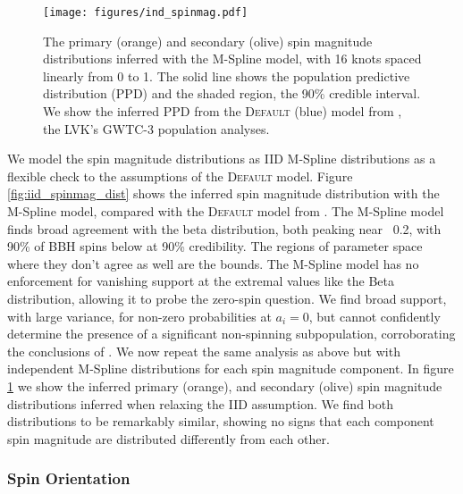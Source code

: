 \begin{figure} 
    \begin{centering}
        \texttt{[image: figures/ind\_spinmag.pdf]}
        \caption{The primary (orange) and secondary (olive) spin magnitude distributions inferred with the M-Spline model, 
        with 16 knots spaced linearly from 0 to 1. The solid line shows the population predictive distribution (PPD) and the shaded region, the 90\% credible interval. 
        We show the inferred PPD from the \textsc{Default} (blue) model from \citet{o3b_astro_dist}, the LVK's GWTC-3 population analyses.}
        \label{fig:ind_spinmag_dist}
    \end{centering}
\end{figure}

We model the spin magnitude distributions as IID M-Spline distributions as a flexible check
to the assumptions of the \textsc{Default} model. Figure \ref{fig:iid_spinmag_dist} shows the inferred spin magnitude distribution with the M-Spline model, 
compared with the \textsc{Default} model from \citet{o3b_astro_dist}. The M-Spline model finds broad agreement with the beta distribution, both peaking near ~0.2, with 90\% 
of BBH spins below \result{$\CIPlusMinus{\macros[MSplineIIDCompSpins][a_90percentile]}$} at 90\% credibility. The regions of parameter space where they don't agree as well are the bounds. 
The M-Spline model has no enforcement for vanishing support at the extremal values like the Beta distribution, 
allowing it to probe the zero-spin question. We find broad support, with large variance, for non-zero probabilities at $a_i=0$, but cannot confidently determine the presence of 
a significant non-spinning subpopulation, corroborating the conclusions of \citet{BuildBetterSpinModels,Callister_NoEvidence,GWTC3MonashSpin}. 
We now repeat the same analysis as above but with independent M-Spline distributions for each spin magnitude component. In figure \ref{fig:ind_spinmag_dist} 
we show the inferred primary (orange), and secondary (olive) spin magnitude distributions inferred when relaxing the IID assumption. We find both 
distributions to be remarkably similar, showing no signs that each component spin magnitude are distributed differently from each other.

\subsubsection{Spin Orientation}

